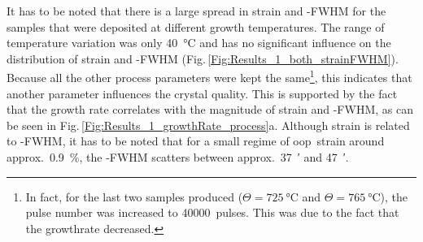 It has to be noted that there is a large spread in strain and \textomega-FWHM for the samples that were deposited at different growth temperatures.
The range of temperature variation was only \qty{40}{\degreeCelsius} and has no significant influence on the distribution of strain and \textomega-FWHM (Fig.\,\ref{Fig:Results_1_both_strainFWHM}).
Because all the other process parameters were kept the same\footnote{
    In fact, for the last two samples produced ($\Theta=\qty{725}{\degreeCelsius}$ and $\Theta=\qty{765}{\degreeCelsius}$), the pulse number was increased to \qty{40000}{pulses}.
    This was due to the fact that the growthrate decreased.
},
this indicates that another parameter influences the crystal quality.
This is supported by the fact that the growth rate correlates with the magnitude of strain and \textomega-FWHM, as can be seen in Fig.\,\ref{Fig:Results_1_growthRate_process}a.
Although strain is related to \textomega-FWHM, it has to be noted that for a small regime of \gls{oop}\ strain around approx.\ \qty{0.9}{\percent}, the \textomega-FWHM scatters between approx.\ \qty{37}{\arcminute} and \qty{47}{\arcminute}.

